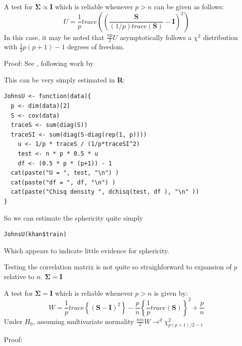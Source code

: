 \begin{theorem}
A test for $\boldsymbol{\Sigma} \propto \boldsymbol{I}$ which is reliable whenever $p > n$ can be given as follows:
\begin{equation}
U = \frac{1}{p} trace \left( (\frac{\boldsymbol{S}}{(1/p)trace(\boldsymbol{S})} - \boldsymbol{I} )^{2} \right)
\end{equation}
In this case, it may be noted that $\frac{np}{2} U$ asymptotically follows a $\chi^{2}$ distribution with $\frac{1}{2}p(p+1)-1$ degrees of freedom. 

Proof: See \cite{Ledoit+Wolf:2002}, following work by \cite{John:1971,John:1972}
\end{theorem}

This can be very simply estimated in \textbf{R}:

\singlespacing
\begin{verbatim}
JohnsU <- function(data){
  p <- dim(data)[2]
  S <- cov(data)
  traceS <- sum(diag(S))
  traceSI <- sum(diag(S-diag(rep(1, p))))
    u <- 1/p * traceS / (1/p*traceSI^2)
    test <- n * p * 0.5 * u
    df <- (0.5 * p * (p+1)) - 1
  cat(paste("U = ", test, "\n") )
  cat(paste("df = ", df, "\n") )
  cat(paste("Chisq density ", dchisq(test, df ), "\n" ))
}
\end{verbatim}
\onehalfspacing

So we can estimate the sphericity quite simply

\singlespacing
\begin{verbatim}
JohnsU(khan$train)
\end{verbatim}
\onehalfspacing

Which appears to indicate little evidence for sphericity.

Testing the correlation matrix is not quite so straighforward to expansion of $p$ relative to $n$.    $\boldsymbol{\Sigma} = \boldsymbol{I}$

\begin{theorem}
A test for $\boldsymbol{\Sigma} = \boldsymbol{I}$ which is reliable whenever $p > n$ is given by:
\begin{equation}
\label{ledoit}
W = \frac{1}{p} trace \left\{ \left( \boldsymbol{S} - \boldsymbol{I} \right)^{2} \right\} - \frac{p}{n} \left\{ \frac{1}{p} trace(\boldsymbol{S}) \right\}^{2} + \frac{p}{n}
\end{equation}
Under $H_{0}$, assuming multivariate normality $\frac{nm}{2} W \rightarrow ^{d} \chi^{2}_{p(p+1)/2-1}$

Proof: \cite{Ledoit+Wolf:2002}
\end{theorem}

